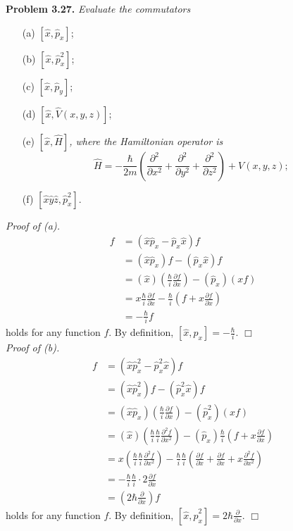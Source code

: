 \documentclass{article}
\begin{document}
\textbf{Problem 3.27.}
\emph{Evaluate the commutators}
\begin{enumerate}
\item[(a)]
$[\hat{x}, \hat{p}_x]$;
\item[(b)]
$[\hat{x}, \hat{p}_x^2]$;
\item[(c)]
$[\hat{x}, \hat{p}_y]$;
\item[(d)]
$[\hat{x}, \hat{V}(x,y,z)]$;
\item[(e)]
\emph{$[\hat{x}, \hat{H}]$, where the Hamiltonian operator is
$$\hat{H} = -\frac{\hbar}{2m}\left(
\frac{\partial^2}{\partial x^2} + \frac{\partial^2}{\partial y^2} + \frac{\partial^2}{\partial z^2}
\right) + V(x,y,z);$$}
\item[(f)]
$[\hat{x}\hat{y}\hat{z}, \hat{p}_x^2]$. \\
\end{enumerate}

\emph{Proof of (a).}
\begin{align*}
[\hat{x}, \hat{p}_x]f
&= (\hat{x}\hat{p}_x - \hat{p}_x \hat{x})f \\
&= (\hat{x}\hat{p}_x)f - (\hat{p}_x \hat{x})f \\
&= (\hat{x})\left( \frac{\hbar}{i}\frac{\partial f}{\partial x} \right)
  - (\hat{p}_x)(xf) \\
&= x \frac{\hbar}{i}\frac{\partial f}{\partial x}
  - \frac{\hbar}{i}\left( f + x \frac{\partial f}{\partial x} \right) \\
&= - \frac{\hbar}{i} f
\end{align*}
holds for any function $f$.
By definition,
$[\hat{x}, \hat{p}_x] = - \frac{\hbar}{i}$.
$\Box$ \\

\emph{Proof of (b).}
\begin{align*}
[\hat{x}, \hat{p}_x^2]f
&= (\hat{x}\hat{p}_x^2 - \hat{p}_x^2 \hat{x})f \\
&= (\hat{x}\hat{p}_x^2)f - (\hat{p}_x^2 \hat{x})f \\
&= (\hat{x} \hat{p}_x)\left( \frac{\hbar}{i}\frac{\partial f}{\partial x} \right)
  - (\hat{p}_x^2)(xf) \\
&= (\hat{x})\left( \frac{\hbar}{i}\frac{\hbar}{i} \frac{\partial^2 f}{\partial x^2} \right)
  - (\hat{p}_x) \frac{\hbar}{i} \left( f + x \frac{\partial f}{\partial x} \right) \\
&= x \left( \frac{\hbar}{i}\frac{\hbar}{i} \frac{\partial^2 f}{\partial x^2} \right)
  - \frac{\hbar}{i} \frac{\hbar}{i} \left(
    \frac{\partial f}{\partial x} + \frac{\partial f}{\partial x}
  + x \frac{\partial^2 f}{\partial x^2} \right) \\
&= - \frac{\hbar}{i} \frac{\hbar}{i} \cdot 2 \frac{\partial f}{\partial x} \\
&= \left( 2 \hbar \frac{\partial}{\partial x} \right) f
\end{align*}
holds for any function $f$.
By definition,
$[\hat{x}, \hat{p}_x^2] = 2 \hbar \frac{\partial}{\partial x}$.
$\Box$ \\
\end{document}
